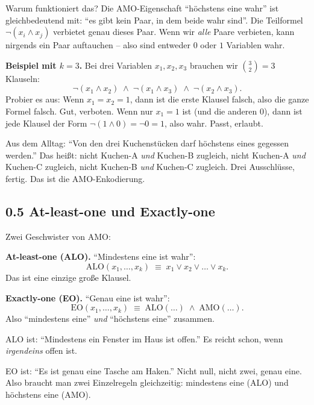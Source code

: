\documentclass[a4paper,12pt]{article}
\begin{document}
Warum funktioniert das? Die AMO-Eigenschaft "`h\"ochstens eine wahr"'
ist gleichbedeutend mit: "`es gibt kein Paar, in dem beide wahr
sind"'. Die Teilformel $\neg(x_i \wedge x_j)$ verbietet genau dieses
Paar. Wenn wir \emph{alle} Paare verbieten, kann nirgends ein Paar
auftauchen -- also sind entweder $0$ oder $1$ Variablen wahr.

\textbf{Beispiel mit $k = 3$.} Bei drei Variablen $x_1, x_2, x_3$
brauchen wir $\binom{3}{2} = 3$ Klauseln:
\[
\neg(x_1 \wedge x_2) \;\wedge\; \neg(x_1 \wedge x_3) \;\wedge\;
\neg(x_2 \wedge x_3).
\]
Probier es aus: Wenn $x_1 = x_2 = 1$, dann ist die erste Klausel
falsch, also die ganze Formel falsch. Gut, verboten. Wenn nur
$x_1 = 1$ ist (und die anderen $0$), dann ist jede Klausel der Form
$\neg(1 \wedge 0) = \neg 0 = 1$, also wahr. Passt, erlaubt.

\begin{analogie}
Aus dem Alltag: "`Von den drei Kuchenst\"ucken darf h\"ochstens eines
gegessen werden."' Das hei{\ss}t: nicht Kuchen-A \emph{und} Kuchen-B
zugleich, nicht Kuchen-A \emph{und} Kuchen-C zugleich, nicht Kuchen-B
\emph{und} Kuchen-C zugleich. Drei Ausschl\"usse, fertig. Das ist die
AMO-Enkodierung.
\end{analogie}

\subsection*{0.5 At-least-one und Exactly-one}

Zwei Geschwister von AMO:

\begin{merkbox}
\textbf{At-least-one (ALO).} "`Mindestens eine ist wahr"':
\[
\text{ALO}(x_1, \ldots, x_k) \;\equiv\; x_1 \vee x_2 \vee \ldots \vee x_k.
\]
Das ist eine einzige gro{\ss}e Klausel.
\medskip

\textbf{Exactly-one (EO).} "`Genau eine ist wahr"':
\[
\text{EO}(x_1, \ldots, x_k) \;\equiv\; \text{ALO}(\ldots) \;\wedge\;
\text{AMO}(\ldots).
\]
Also "`mindestens eine"' \emph{und} "`h\"ochstens eine"' zusammen.
\end{merkbox}

\begin{analogie}
ALO ist: "`Mindestens ein Fenster im Haus ist offen."' Es reicht
schon, wenn \emph{irgendeins} offen ist.
\medskip

EO ist: "`Es ist genau eine Tasche am Haken."' Nicht null, nicht
zwei, genau eine. Also braucht man zwei Einzelregeln gleichzeitig:
mindestens eine (ALO) und h\"ochstens eine (AMO).
\end{analogie}
\end{document}
